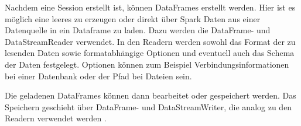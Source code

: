 Nachdem eine Session erstellt ist, können DataFrames erstellt werden.
Hier ist es möglich eine leeres zu erzeugen oder direkt über Spark Daten aus einer Datenquelle in ein Dataframe zu laden.
Dazu werden die DataFrame- und DataStreamReader verwendet.
In den Readern werden sowohl das Format der zu lesenden Daten sowie formatabhängige Optionen und eventuell auch das Schema der Daten festgelegt.
Optionen können zum Beispiel Verbindungsinformationen bei einer Datenbank oder der Pfad bei Dateien sein.

Die geladenen DataFrames können dann bearbeitet oder gespeichert werden.
Das Speichern geschieht über DataFrame- und DataStreamWriter, die analog zu den Readern verwendet werden \parencite{spark-website}.
